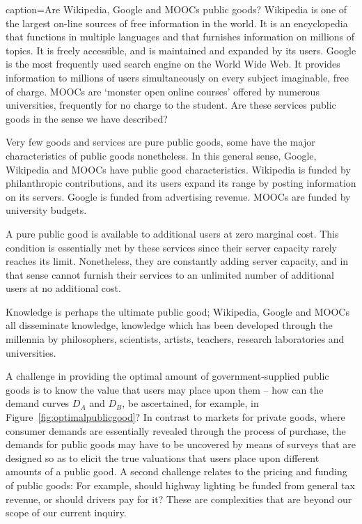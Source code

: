 \begin{ApplicationBox}{caption={Are Wikipedia, Google and MOOCs public goods? \label{app:wikigoogle}}}
	Wikipedia is one of the largest on-line sources of free information in the world. It is an encyclopedia that functions in multiple languages and that furnishes information on millions of topics. It is freely accessible, and is maintained and expanded by its users. Google is the most frequently used search engine on the World Wide Web. It provides information to millions of users simultaneously on every subject imaginable, free of charge. MOOCs are `monster open online courses' offered by numerous universities, frequently for no charge to the student. Are these services public goods in the sense we have described?
	
	Very few goods and services are pure public goods, some have the major characteristics of public goods nonetheless. In this general sense, Google, Wikipedia and MOOCs have public good characteristics. Wikipedia is funded by philanthropic contributions, and its users expand its range by posting information on its servers. Google is funded from advertising revenue. MOOCs are funded by university budgets.
	
	A pure public good is available to additional users at zero marginal cost. This condition is essentially met by these services since their server capacity rarely reaches its limit. Nonetheless, they are constantly adding server capacity, and in that sense cannot furnish their services to an unlimited number of additional users at no additional cost.
	
	Knowledge is perhaps the ultimate public good; Wikipedia, Google and MOOCs all disseminate knowledge, knowledge which has been developed through the millennia by philosophers, scientists, artists, teachers, research laboratories and universities.
\end{ApplicationBox}

A challenge in providing the optimal amount of government-supplied public
goods is to know the value that users may place upon them -- how can the
demand curves $D_A$ and $D_B$, be ascertained, for example, in Figure~\ref{fig:optimalpublicgood}?
In contrast to markets for private goods, where
consumer demands are essentially revealed through the process of purchase,
the demands for public goods may have to be uncovered by means of surveys
that are designed so as to elicit the true valuations that users place upon
different amounts of a public good. A second challenge relates to the
pricing and funding of public goods: For example, should highway lighting be
funded from general tax revenue, or should drivers pay for it? These are
complexities that are beyond our scope of our current inquiry.

